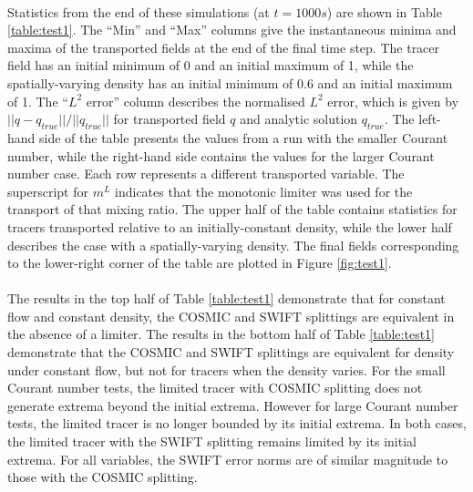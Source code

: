 \documentclass[11pt,a4paper]{article}
\begin{document}
\\
Statistics from the end of these simulations (at $t=1000 s$) are shown in Table \ref{table:test1}.
The ``Min'' and ``Max'' columns give the instantaneous minima and maxima of the transported fields at the end of the final time step.
The tracer field has an initial minimum of 0 and an initial maximum of 1, while the spatially-varying density has an initial minimum of 0.6 and an initial maximum of 1.
The ``$L^2$ error'' column describes the normalised $L^2$ error, which is given by $||q - q_{true}||/||q_{true}||$ for transported field $q$ and analytic solution $q_{true}$.
The left-hand side of the table presents the values from a run with the smaller Courant number, while the right-hand side contains the values for the larger Courant number case.
Each row represents a different transported variable.
The superscript for $m^L$ indicates that the monotonic limiter was used for the transport of that mixing ratio.
The upper half of the table contains statistics for tracers transported relative to an initially-constant density, while the lower half describes the case with a spatially-varying density.
The final fields corresponding to the lower-right corner of the table are plotted in Figure \ref{fig:test1}.\\
\\
The results in the top half of Table \ref{table:test1} demonstrate that for constant flow and constant density, the COSMIC and SWIFT splittings are equivalent in the absence of a limiter. The results in the bottom half of Table \ref{table:test1} demonstrate that the COSMIC and SWIFT splittings are equivalent for density under constant flow, but not for tracers when the density varies. 
For the small Courant number tests, the limited tracer with COSMIC splitting does not generate extrema beyond the initial extrema.
However for large Courant number tests, the limited tracer is no longer bounded by its initial extrema.
In both cases, the limited tracer with the SWIFT splitting remains limited by its initial extrema.
For all variables, the SWIFT error norms are of similar magnitude to those with the COSMIC splitting.
\end{document}
